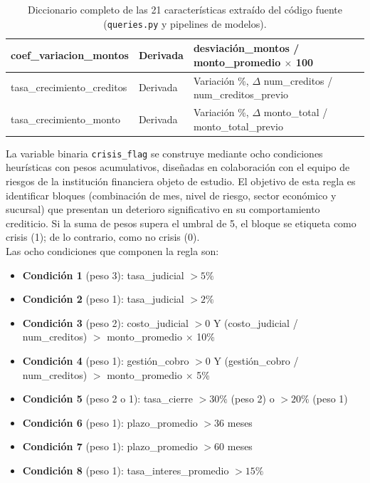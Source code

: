 \begin{table}[H]
\begin{tabular}{
        | >{\raggedright\arraybackslash}p{5.0cm}
        | >{\raggedright\arraybackslash}p{2.0cm}        
        | >{\raggedright\arraybackslash}p{7.5cm} |
        }
    \hline
        coef\_variacion\_montos & Derivada & desviación\_montos / monto\_promedio $\times$ 100 \\
    \hline
        tasa\_crecimiento\_creditos & Derivada & Variación \%, $\Delta$ num\_creditos / num\_creditos\_previo \\
    \hline
        tasa\_crecimiento\_monto & Derivada & Variación \%, $\Delta$ monto\_total / monto\_total\_previo \\
    \hline
    \end{tabular}
    \caption{Diccionario completo de las 21 características extraído del código fuente (\texttt{queries.py} y pipelines de modelos).}
    \label{tab:caracteristicas}
\end{table}

La variable binaria \texttt{crisis\_flag} se construye mediante ocho condiciones heurísticas con pesos acumulativos, diseñadas en colaboración con el equipo de riesgos de la institución financiera objeto de estudio. El objetivo de esta regla es identificar bloques (combinación de mes, nivel de riesgo, sector económico y sucursal) que presentan un deterioro significativo en su comportamiento crediticio. Si la suma de pesos supera el umbral de 5, el bloque se etiqueta como crisis (1); de lo contrario, como no crisis (0).\\

Las ocho condiciones que componen la regla son:\\
\begin{itemize}
    \item \textbf{Condición 1} (peso 3): tasa\_judicial $> 5\%$
    \item \textbf{Condición 2} (peso 1): tasa\_judicial $> 2\%$
    \item \textbf{Condición 3} (peso 2): costo\_judicial $> 0$ Y (costo\_judicial / num\_creditos) $> $ monto\_promedio $\times$ 10\%
    \item \textbf{Condición 4} (peso 1): gestión\_cobro $> 0$ Y (gestión\_cobro / num\_creditos) $> $ monto\_promedio $\times$ 5\%
    \item \textbf{Condición 5} (peso 2 o 1): tasa\_cierre $> 30\%$ (peso 2) o $> 20\%$ (peso 1)
    \item \textbf{Condición 6} (peso 1): plazo\_promedio $> 36$ meses
    \item \textbf{Condición 7} (peso 1): plazo\_promedio $> 60$ meses
    \item \textbf{Condición 8} (peso 1): tasa\_interes\_promedio $> 15\%$
\end{itemize}

